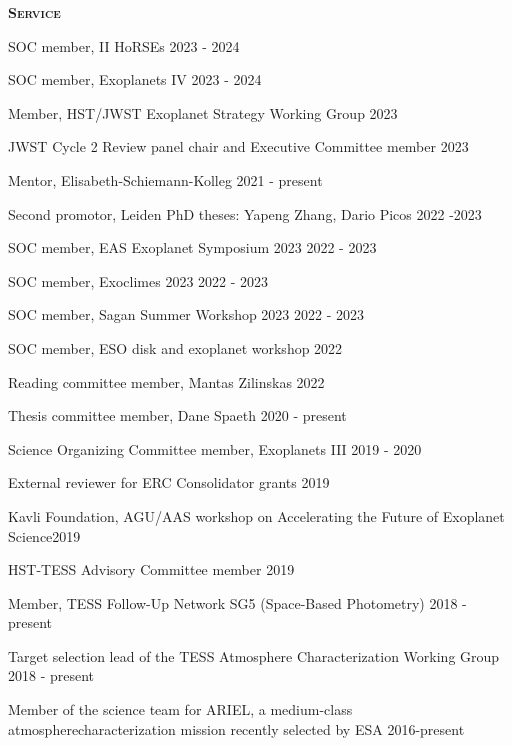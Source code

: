 \documentclass[12pt,letterpaper]{article}
\begin{document}
\textbf{\textsc{Service}} 
\begin{compactitem}[]
\item {SOC member, II HoRSEs \hfill 2023 - 2024}
\item {SOC member, Exoplanets IV \hfill 2023 - 2024}
\item {Member, HST/JWST Exoplanet Strategy Working Group \hfill 2023}
\item {JWST Cycle 2 Review panel chair and Executive Committee member \hfill 2023}
\item{Mentor, Elisabeth-Schiemann-Kolleg \hfill 2021 - present}
\item {Second promotor, Leiden PhD theses: Yapeng Zhang, Dario Picos \hfill 2022 -2023}
\item {SOC member, EAS Exoplanet Symposium 2023 \hfill 2022 - 2023}
\item {SOC member, Exoclimes 2023 \hfill 2022 - 2023}
\item {SOC member, Sagan Summer Workshop 2023 \hfill 2022 - 2023}
\item {SOC member, ESO disk and exoplanet workshop \hfill 2022}
\item {Reading committee member, Mantas Zilinskas \hfill 2022}
\item {Thesis committee member, Dane Spaeth \hfill 2020 -  present}
\item {Science Organizing Committee member, Exoplanets III \hfill 2019 - 2020}
\item {External reviewer for ERC Consolidator grants \hfill 2019}
\item {Kavli Foundation, AGU/AAS workshop on Accelerating the Future of Exoplanet Science\hfill 2019}
\item {HST-TESS Advisory Committee member \hfill 2019}
\item {Member, TESS Follow-Up Network SG5 (Space-Based Photometry) \hfill 2018 - present}
\item {Target selection lead of the TESS Atmosphere Characterization Working Group \hfill 2018 - present}	
\item {Member of the science team for ARIEL, a medium-class atmosphere\newline characterization mission recently selected by ESA \hfill 2016-present}

\end{compactitem}
\end{document}
